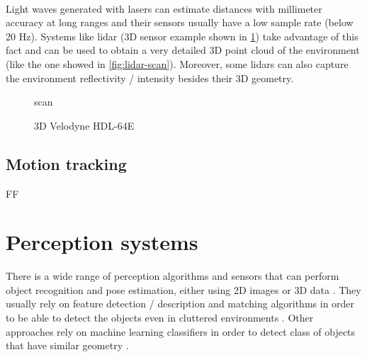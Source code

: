 \paragraph{}

Light waves generated with lasers can estimate distances with millimeter accuracy at long ranges and their sensors usually have a low sample rate (below 20 Hz). Systems like \gls{lidar} (3D sensor example shown in \cref{fig:velodyne-hdl-64e}) take advantage of this fact and can be used to obtain a very detailed 3D point cloud of the environment (like the one showed in \cref{fig:lidar-scan}). Moreover, some \glspl{lidar} can also capture the environment reflectivity / intensity besides their 3D geometry.

\begin{figure}[H]
	\begin{floatrow}[2]
		{\caption[ scan]{ scan\protect\footnotemark}\label{fig:lidar-scan}}
		{\caption[3D Velodyne HDL-64E]{3D Velodyne HDL-64E\protect\footnotemark}\label{fig:velodyne-hdl-64e}}
	\end{floatrow}
\end{figure}



\subsection{Motion tracking}

FF



\section{Perception systems}

There is a wide range of perception algorithms and sensors that can perform object recognition and pose estimation, either using 2D images \cite{Marton2011,Gauglitz2011,Costa2016ICARSC} or 3D data \cite{Wohlkinger2012,Aldoma2011}. They usually rely on feature detection / description and matching algorithms in order to be able to detect the objects even in cluttered environments \cite{Aldoma2016}. Other approaches rely on machine learning classifiers in order to detect class of objects that have similar geometry \cite{Costa2014,Rocha2015}.

